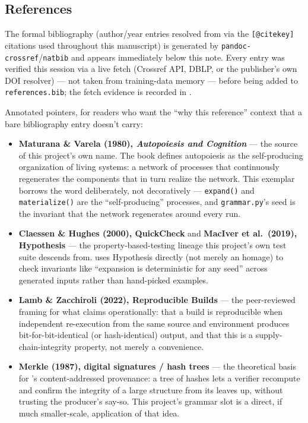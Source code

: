 \documentclass[
]{article}
\providecommand{\tightlist}{%
  \setlength{\itemsep}{0pt}\setlength{\parskip}{0pt}}
\begin{document}
\newpage

\subsection{References}\label{references}

The formal bibliography (author/year entries resolved from
 via the \texttt{{[}@citekey{]}}
citations used throughout this manuscript) is generated by
\texttt{pandoc-crossref}/\texttt{natbib} and appears immediately below
this note. Every entry was verified this session via a live fetch
(Crossref API, DBLP, or the publisher's own DOI resolver) --- not taken
from training-data memory --- before being added to
\texttt{references.bib}; the fetch evidence is recorded in
.

Annotated pointers, for readers who want the ``why this reference''
context that a bare bibliography entry doesn't carry:

\begin{itemize}
\tightlist
\item
  \textbf{Maturana \& Varela (1980), \emph{Autopoiesis and Cognition}}
  \citep{maturana_varela_1980} --- the source of this project's own
  name. The book defines autopoiesis as the self-producing organization
  of living systems: a network of processes that continuously
  regenerates the components that in turn realize the network. This
  exemplar borrows the word deliberately, not decoratively ---
  \texttt{expand()} and \texttt{materialize()} are the
  ``self-producing'' processes, and \texttt{grammar.py}'s seed is the
  invariant that the network regenerates around every run.
\item
  \textbf{Claessen \& Hughes (2000), QuickCheck}
  \citep{claessen2000quickcheck} and \textbf{MacIver et al.~(2019),
  Hypothesis} \citep{maciver2019hypothesis} --- the
  property-based-testing lineage this project's own test suite descends
  from.  uses Hypothesis
  directly (not merely an homage) to check invariants like ``expansion
  is deterministic for any seed'' across generated inputs rather than
  hand-picked examples.
\item
  \textbf{Lamb \& Zacchiroli (2022), Reproducible Builds}
  \citep{reproducible_builds} --- the peer-reviewed framing for what
   claims operationally: that
  a build is reproducible when independent re-execution from the same
  source and environment produces bit-for-bit-identical (or
  hash-identical) output, and that this is a supply-chain-integrity
  property, not merely a convenience.
\item
  \textbf{Merkle (1987), digital signatures / hash trees}
  \citep{merkle_tree_provenance} --- the theoretical basis for
  's content-addressed provenance: a tree of
  hashes lets a verifier recompute and confirm the integrity of a large
  structure from its leaves up, without trusting the producer's say-so.
  This project's  grammar slot is a
  direct, if much smaller-scale, application of that idea.
\end{itemize}



\clearpage


\end{document}
